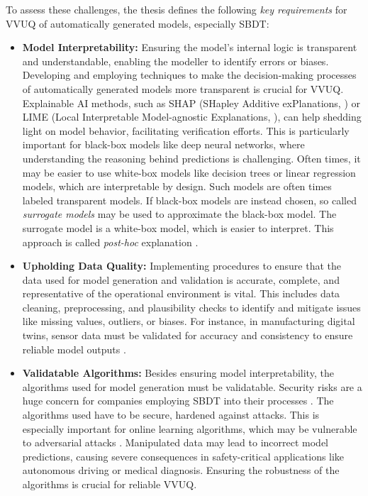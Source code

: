 To assess these challenges, the thesis defines the following \textit{key requirements} for VVUQ of automatically generated models, especially SBDT:
\begin{itemize}
  \item \textbf{Model Interpretability:} \label{par:surrogate} Ensuring the model's internal logic is transparent and understandable, enabling the modeller to identify errors or biases. Developing and employing techniques to make the decision-making processes of automatically generated models more transparent is crucial for VVUQ. Explainable AI methods, such as SHAP (SHapley Additive exPlanations, \autocite{lundberg2017unified}) or LIME (Local Interpretable Model-agnostic Explanations, \autocite{ribeiro2016should}), can help shedding light on model behavior, facilitating verification efforts. This is particularly important for black-box models like deep neural networks, where understanding the reasoning behind predictions is challenging. Often times, it may be easier to use white-box models like decision trees or linear regression models, which are interpretable by design. Such models are often times labeled transparent models. If black-box models are instead chosen, so called \textit{surrogate models} may be used to approximate the black-box model. The surrogate model is a white-box model, which is easier to interpret. This approach is called \textit{post-hoc} explanation \autocite{fischer2024demystifying}.
  \item \textbf{Upholding Data Quality:} Implementing procedures to ensure that the data used for model generation and validation is accurate, complete, and representative of the operational environment is vital. This includes data cleaning, preprocessing, and plausibility checks to identify and mitigate issues like missing values, outliers, or biases. For instance, in manufacturing digital twins, sensor data must be validated for accuracy and consistency to ensure reliable model outputs \autocite{rodriguez2023updating}.
  \item \textbf{Validatable Algorithms:} Besides ensuring model interpretability, the algorithms used for model generation must be validatable. Security risks are a huge concern for companies employing SBDT into their processes \autocite{alcaraz2022digital}. The algorithms used have to be secure, hardened against attacks. This is especially important for online learning algorithms, which may be vulnerable to adversarial attacks \autocite{balta2023digital}. Manipulated data may lead to incorrect model predictions, causing severe consequences in safety-critical applications like autonomous driving or medical diagnosis. Ensuring the robustness of the algorithms is crucial for reliable VVUQ.

\end{itemize}
